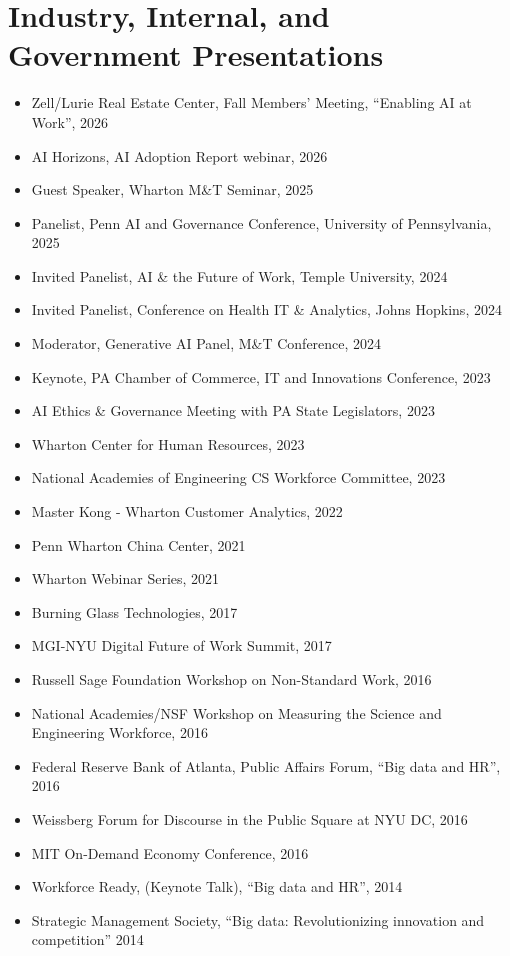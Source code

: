 \documentclass[10pt,letterpaper]{article}
\begin{document}
\section*{Industry, Internal, and Government Presentations}
\begin{itemize}
\item Zell/Lurie Real Estate Center, Fall Members' Meeting, ``Enabling AI at Work'', 2026
\item AI Horizons, AI Adoption Report webinar, 2026
\item Guest Speaker, Wharton M\&T Seminar, 2025
\item Panelist, Penn AI and Governance Conference, University of Pennsylvania, 2025
\item Invited Panelist, AI \& the Future of Work, Temple University, 2024
\item Invited Panelist, Conference on Health IT \& Analytics, Johns Hopkins, 2024
\item Moderator, Generative AI Panel, M\&T Conference, 2024
\item Keynote, PA Chamber of Commerce, IT and Innovations Conference, 2023
\item AI Ethics \& Governance Meeting with PA State Legislators, 2023
\item Wharton Center for Human Resources, 2023
\item National Academies of Engineering CS Workforce Committee, 2023
\item Master Kong - Wharton Customer Analytics, 2022
\item Penn Wharton China Center, 2021
\item Wharton Webinar Series, 2021
\item Burning Glass Technologies, 2017
\item MGI-NYU Digital Future of Work Summit, 2017
\item Russell Sage Foundation Workshop on Non-Standard Work, 2016
\item National Academies/NSF Workshop on Measuring the Science and Engineering Workforce, 2016
\item Federal Reserve Bank of Atlanta, Public Affairs Forum, ``Big data and HR'', 2016
\item Weissberg Forum for Discourse in the Public Square at NYU DC, 2016
\item MIT On-Demand Economy Conference, 2016
\item Workforce Ready, (Keynote Talk), ``Big data and HR'', 2014
\item Strategic Management Society, ``Big data: Revolutionizing innovation and competition'' 2014 

\end{itemize}
\end{document}
